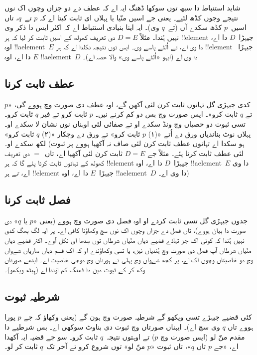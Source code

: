 \documentclass[../../../include/open-logic-section]{subfiles}
\begin{document}
شاید استنباط دا سبھ توں سوکھا ڈھنگ ایہ اے کہ عطف دے دو جزاں وچوں اک نوں نتیجے وجوں کڈھ لئیے۔ یعنی جے اسیں منّیا یا پہلاں ای ثابت کیتا اے کہ $p$ تے~$q$، تاں اسیں~$p$ کڈھ سکدے آں (تے~$q$ وی)۔ ایہ اینا بنیادی استنباط اے کہ اکثر ایس دا ذکر وی نہیں ہُندا۔ مثلاً $D = E$ دی تعریف کھولھ کے اسیں ثابت کر لیا کہ ہر !!{element} جیہڑا~$D$ دا اے، اوہ !!a{element}~$E$ دا وی اے، تے اُلٹے پاسے وی۔ ایس توں نتیجہ نکلدا اے کہ ہر !!{element} جیہڑا~$E$ دا اے، اوہ !!a{element}~$D$ دا وی اے (ایہو «اُلٹے پاسے وی» والا حصہ اے)۔

\subsection{عطف ثابت کرنا}

کدی جیہڑی گل تہانوں ثابت کرن لئی آکھن گے، اوہ عطف دی صورت وچ ہووے گی، «$p$ تے $q$ ثابت کرو»۔ ایس صورت وچ بس دو کم کرنے نیں۔ $p$ ثابت کرو تے فیر $q$ ثابت کرو۔ تسی ثبوت دو حصیاں وچ ونڈ سکدے او تے صفائی لئی اوہناں نوں نشان لا سکدے او۔ پہلاں نوٹ بناندیاں ورق دے اُتے «(۱) $p$ ثابت کرو» تے ورق دے وچکار «(۲) $q$ ثابت کرو» لکھ سکدے او۔ (ہو سکدا اے تہانوں عطف ثابت کرن لئی صاف نہ آکھیا ہووے پر ثبوت لئی عطف ثابت کرنا پئے۔ مثلاً جے $D = E$ ثابت کرن لئی آکھیا اے، تاں~$=$ دی تعریف کھولھ کے تہانوں ثابت کرنا پئے گا کہ ہر !!{element} جیہڑا~$D$ دا اے، اوہ !!a{element}~$E$ دا وی اے، \emph{تے} ہر !!{element} جیہڑا~$E$ دا اے، اوہ !!a{element}~$D$ دا وی اے۔)

\subsection{فصل ثابت کرنا}

جدوں جیہڑی گل تسی ثابت کردے او اوہ فصل دی صورت وچ ہووے (یعنی «$p$ یا $q$» دی صورت دا بیان ہووے)، تاں فصل دے جزاں وچوں اک نوں سچ وکھاؤنا کافی اے۔ پر ایہ لگ بھگ کدی نہیں ہُندا کہ کوئی اک جز تہاڈے قضیے دیاں منّیاں شرطاں توں سِدھا ای نکل آوے۔ اکثر قضیے دیاں منّیاں شرطاں آپ فصل دی صورت وچ ہُندیاں نیں، یا تسی وکھاؤندے او کہ اک قسم دیاں ساریاں شےواں وچ دو خاصیتاں وچوں اک اے، پر کجھ شےواں وچ پہلی تے ہورناں وچ دوجی خاصیت اے۔ ایتھے صورتاں وکھ کر کے ثبوت دین دا ڈھنگ کم آؤندا اے (ہِیٹھ ویکھو)۔

\subsection{شرطیہ ثبوت}

کئی قضیے جیہڑے تسی ویکھو گے شرطیہ صورت وچ ہون گے (یعنی وکھاؤ کہ جے $p$ پورا ہووے تاں $q$ وی سچ اے)۔ ایہناں صورتاں وچ ثبوت دی بناوٹ سوکھی اے۔ بس شرطیے دا مقدم منّ لو (ایس صورت وچ $p$) تے اوہتوں نتیجہ~$q$ ثابت کرو۔ سو جے قضیہ ایہ آکھدا اے، «جے $p$ تاں $q$»، تاں ثبوت «$p$ منّ لو» توں شروع کرو تے آخر تک~$q$ ثابت کر لو۔
\end{document}
